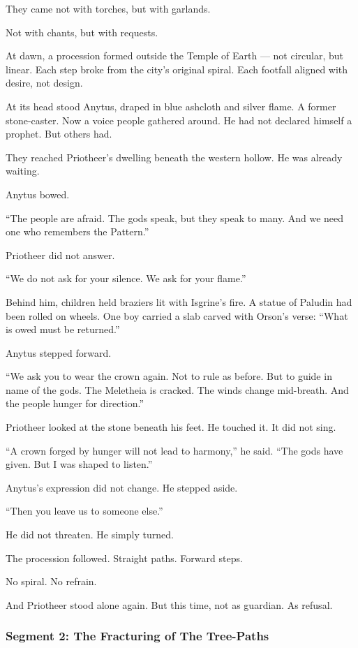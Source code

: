 \documentclass[9pt]{article}
\begin{document}
They came not with torches, but with garlands.

Not with chants, but with requests.

At dawn, a procession formed outside the Temple of Earth —  
not circular, but linear.  
Each step broke from the city's original spiral.  
Each footfall aligned with desire, not design.

At its head stood Anytus, draped in blue ashcloth and silver flame.  
A former stone-caster. Now a voice people gathered around.  
He had not declared himself a prophet.  
But others had.

They reached Priotheer's dwelling beneath the western hollow.  
He was already waiting.

Anytus bowed.

 “The people are afraid.  
 The gods speak, but they speak to many.  
 And we need one who remembers the Pattern.”

Priotheer did not answer.

 “We do not ask for your silence.  
 We ask for your flame.”

Behind him, children held braziers lit with Isgrine’s fire.  
A statue of Paludin had been rolled on wheels.  
One boy carried a slab carved with Orson’s verse:  
 “What is owed must be returned.”

Anytus stepped forward.

 “We ask you to wear the crown again.  
 Not to rule as before.  
 But to guide in name of the gods.  
 The Meletheia is cracked.  
 The winds change mid-breath.  
 And the people hunger for direction.”

Priotheer looked at the stone beneath his feet.  
He touched it.  
It did not sing.

 “A crown forged by hunger will not lead to harmony,” he said.  
 “The gods have given.  
 But I was shaped to listen.”

Anytus’s expression did not change.  
He stepped aside.

 “Then you leave us to someone else.”

He did not threaten.  
He simply turned.

The procession followed.  
Straight paths. Forward steps.

No spiral.  
No refrain.

And Priotheer stood alone again.  
But this time, not as guardian.  
As refusal.


\newpage

\subsubsection*{Segment 2: The Fracturing of The Tree-Paths}
\end{document}

